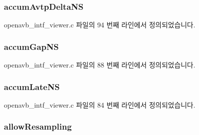 \subsubsection[{\texorpdfstring{accum\+Avtp\+Delta\+NS}{accumAvtpDeltaNS}}]{ accum\+Avtp\+Delta\+NS}\hypertarget{structpvt__data__t_ae85b3b48f8aab43e38759682515eaf29}{}\label{structpvt__data__t_ae85b3b48f8aab43e38759682515eaf29}


openavb\+\_\+intf\+\_\+viewer.\+c 파일의 94 번째 라인에서 정의되었습니다.

\subsubsection[{\texorpdfstring{accum\+Gap\+NS}{accumGapNS}}]{ accum\+Gap\+NS}\hypertarget{structpvt__data__t_a6c3ebd735ffa63059d07bc57cf0a88d9}{}\label{structpvt__data__t_a6c3ebd735ffa63059d07bc57cf0a88d9}


openavb\+\_\+intf\+\_\+viewer.\+c 파일의 88 번째 라인에서 정의되었습니다.

\subsubsection[{\texorpdfstring{accum\+Late\+NS}{accumLateNS}}]{ accum\+Late\+NS}\hypertarget{structpvt__data__t_ab2ffdf9683224595417bc3344d11b675}{}\label{structpvt__data__t_ab2ffdf9683224595417bc3344d11b675}


openavb\+\_\+intf\+\_\+viewer.\+c 파일의 84 번째 라인에서 정의되었습니다.

\subsubsection[{\texorpdfstring{allow\+Resampling}{allowResampling}}]{ allow\+Resampling}\hypertarget{structpvt__data__t_a7e6b568c4e7243f345d1b67c1c2ac14d}{}\label{structpvt__data__t_a7e6b568c4e7243f345d1b67c1c2ac14d}



